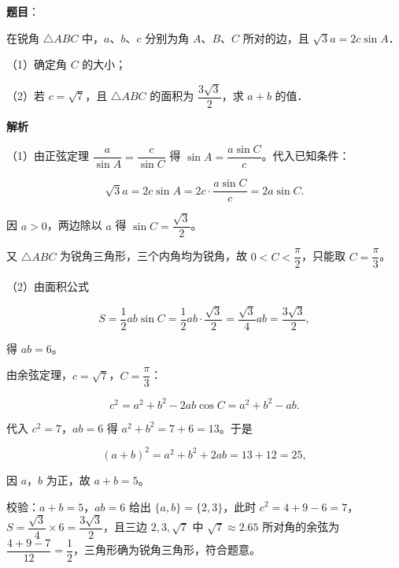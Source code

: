 \begin{answer}

\textbf{题目}：

在锐角 $\triangle ABC$ 中，$a$、$b$、$c$ 分别为角 $A$、$B$、$C$ 所对的边，且 $\sqrt3a=2c\sin A$．

（1）确定角 $C$ 的大小；

（2）若 $c=\sqrt7$，且 $\triangle ABC$ 的面积为 $\dfrac{3\sqrt3}{2}$，求 $a+b$ 的值．

\textbf{解析}

（1）由正弦定理 $\dfrac{a}{\sin A}=\dfrac{c}{\sin C}$ 得 $\sin A=\dfrac{a\sin C}{c}$。代入已知条件：

\nopagebreak[4]
\[\sqrt3a=2c\sin A=2c\cdot\frac{a\sin C}{c}=2a\sin C.\]

因 $a>0$，两边除以 $a$ 得 $\sin C=\dfrac{\sqrt3}{2}$。

又 $\triangle ABC$ 为锐角三角形，三个内角均为锐角，故 $0<C<\dfrac\pi2$，只能取 $C=\dfrac\pi3$。

（2）由面积公式

\nopagebreak[4]
\[S=\frac12ab\sin C=\frac12ab\cdot\frac{\sqrt3}{2}=\frac{\sqrt3}{4}ab=\frac{3\sqrt3}{2},\]

得 $ab=6$。

由余弦定理，$c=\sqrt7$，$C=\dfrac\pi3$：

\nopagebreak[4]
\[c^2=a^2+b^2-2ab\cos C=a^2+b^2-ab.\]

代入 $c^2=7$，$ab=6$ 得 $a^2+b^2=7+6=13$。于是

\nopagebreak[4]
\[(a+b)^2=a^2+b^2+2ab=13+12=25,\]

因 $a$，$b$ 为正，故 $a+b=5$。

校验：$a+b=5$，$ab=6$ 给出 $\{a,b\}=\{2,3\}$，此时 $c^2=4+9-6=7$，$S=\dfrac{\sqrt3}{4}\times6=\dfrac{3\sqrt3}{2}$，且三边 $2,3,\sqrt7$ 中 $\sqrt7\approx2.65$ 所对角的余弦为 $\dfrac{4+9-7}{12}=\dfrac12$，三角形确为锐角三角形，符合题意。


\end{answer}
